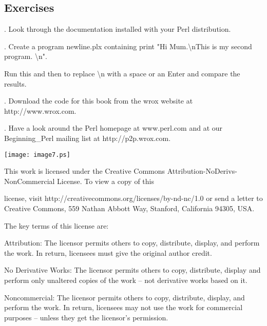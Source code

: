 \documentclass[a4paper,11pt]{book}
\begin{document}
\noindent 

\subsection{Exercises}

\noindent 

.  Look through the documentation installed with your Perl distribution.

\noindent 

.  Create a program newline.plx containing print "Hi Mum.\textbackslash nThis is my second program. \textbackslash n".

\noindent Run this and then to replace \textbackslash n with a space or an Enter and compare the results.

\noindent 

.  Download the code for this book from the wrox website at http://www.wrox.com.

\noindent 

.  Have a look around the Perl homepage at www.perl.com and at our Beginning\_Perl mailing list at http://p2p.wrox.com.

\noindent 

\noindent 

\noindent 

\noindent 

\noindent 

\noindent \texttt{[image: image7.ps]}

\noindent 

\noindent This work is licensed under the Creative Commons Attribution-NoDerivs-NonCommercial License. To view a copy of this

\noindent license, visit http://creativecommons.org/licenses/by-nd-nc/1.0 or send a letter to Creative Commons, 559 Nathan Abbott Way, Stanford, California 94305, USA.

\noindent 

\noindent The key terms of this license are:

\noindent 

\noindent Attribution: The licensor permits others to copy, distribute, display, and perform the work. In return, licensees must give the original author credit.

\noindent 

\noindent No Derivative Works: The licensor permits others to copy, distribute, display and perform only unaltered copies of the work -- not derivative works based on it.

\noindent 

\noindent Noncommercial: The licensor permits others to copy, distribute, display, and perform the work. In return, licensees may not use the work for commercial purposes -- unless they get the licensor's permission.
\end{document}
